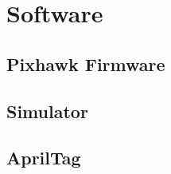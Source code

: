\documentclass{article}[12pt]
\begin{document}
\section*{Software}
\subsection*{Pixhawk Firmware}

\subsection*{Simulator}

\subsection*{AprilTag}







{}

\end{document}
